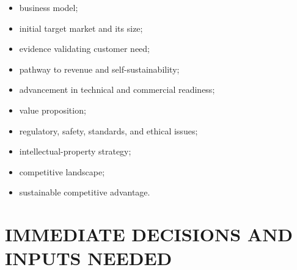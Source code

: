 \documentclass[11pt,letterpaper]{article}
\begin{document}
\begin{itemize}[leftmargin=0.25in]
    \item business model;
    \item initial target market and its size;
    \item evidence validating customer need;
    \item pathway to revenue and self-sustainability;
    \item advancement in technical and commercial readiness;
    \item value proposition;
    \item regulatory, safety, standards, and ethical issues;
    \item intellectual-property strategy;
    \item competitive landscape;
    \item sustainable competitive advantage.
\end{itemize}

\section*{IMMEDIATE DECISIONS AND INPUTS NEEDED}
\end{document}
